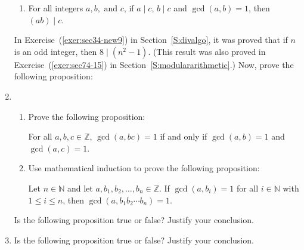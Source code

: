 \begin{enumerate}
\begin{enumerate}
  \item For all integers $a, b, \text{ and }c$, if  $a \mid c$,  $b \mid c$ and  
        $\gcd( {a, b} ) = 1$, then  $( {ab} )  \mid  c$.
\end{enumerate}

\xitem In Exercise~(\ref{exer:sec34-new9}) in Section~\ref{S:divalgo}, it was proved that if $n$ is an odd integer, then $8 \mid \left( n^2 - 1 \right)$.  (This result was also proved in 
Exercise~(\ref{exer:sec74-15}) in Section~\ref{S:modulararithmetic}.)  Now, prove the following proposition: \label{exer:24divides-nsquaredminus1}


\item \begin{enumerate} \item Prove the following proposition:

For all  $a, b, c \in \mathbb{Z}$, $\gcd(a, bc) = 1$ if and only if $\gcd( {a, b} ) = 1$ and  
$\gcd( {a, c} ) = 1$.

  \item Use mathematical induction to prove the following proposition:

Let  $n \in \mathbb{N}$ and let  $a, b_1 , b_2 ,  \ldots , b_n  \in \mathbb{Z}$.  If  
$\gcd \!\left( {a, b_i } \right) = 1$ for all  $i \in \mathbb{N}$ with  
$1 \leq i \leq n$, then  $\gcd \!\left( {a, b_1 b_2  \cdots b_n } \right) = 1$.
\end{enumerate}

\xitem Is the following proposition true or false? Justify your conclusion.
\label{exer:cdividessum}

\item Is the following proposition true or false? Justify your conclusion.


\end{enumerate}
